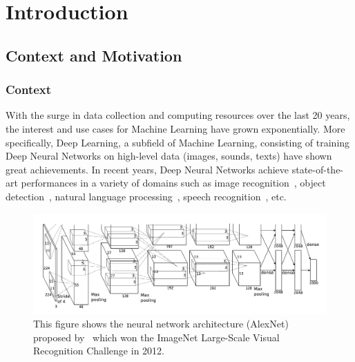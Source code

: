 \chapter{Introduction}
\label{chapter:ch1-introduction}
\localtableofcontents

\section{Context and Motivation}
\label{section:ch1-context_and_motivation}

\subsection{Context}
\label{subsection:ch1-context}

With the surge in data collection and computing resources over the last 20 years, the interest and use cases for Machine Learning have grown exponentially.
More specifically, Deep Learning, a subfield of Machine Learning, consisting of training Deep Neural Networks on high-level
data (images, sounds, texts) have shown great achievements.
In recent years, Deep Neural Networks achieve state-of-the-art performances in a variety of domains such as image recognition~\cite{lecun1998gradient,krizhevsky2012imagenet,he2016deep,tan2019efficientnet}, object detection~\cite{redmon2016you,liu2016ssd,redmon2017yolo9000}, natural language processing~\cite{merity2016pointer,radford2018Language,brown2020language}, speech recognition~\cite{hinton2012deep,abdel2014convolutional,yu2016automatic}, etc.

\begin{figure}[t]
  \centering
  \includegraphics[scale=0.2]{figures/main/ch1-introduction/alexnet.png}
  \caption{This figure shows the neural network architecture (AlexNet) proposed by~\citet{krizhevsky2012imagenet} which won the ImageNet Large-Scale Visual Recognition Challenge in 2012.}
  \label{figure:ch1-alexnet_network}
\end{figure}

